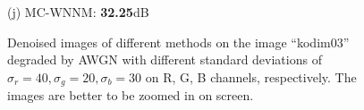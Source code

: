 \documentclass[10pt,onecolumn,letterpaper]{article}
\begin{document}
\begin{figure}[!htbp]
{\begin{minipage}[t]{0.25\textwidth}
{\footnotesize (j) MC-WNNM: \textbf{32.25}dB}
\end{minipage}
}
\caption{Denoised images of different methods on the image ``kodim03'' degraded by AWGN with different standard deviations of $\sigma_{r}=40, \sigma_{g}=20, \sigma_{b}=30$ on R, G, B channels, respectively. The images are better to be zoomed in on screen.}
\label{f2}
\end{figure}

\begin{figure}[!htbp]
\centering
{}
\end{figure}
\end{document}

